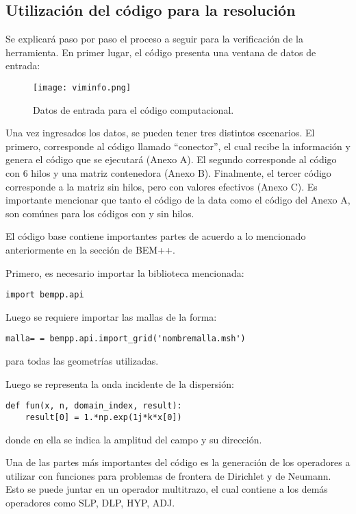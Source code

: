 \documentclass[12pt,letterpaper]{article}
\numberwithin{equation}{section}
\begin{document}
\subsection{Utilización del código para la resolución}

Se explicará paso por paso el proceso a seguir para la verificación de la herramienta. En primer lugar, el código presenta una ventana de datos de entrada:

\begin{figure}[H]
	\centering\texttt{[image: viminfo.png]}\\
	\caption{Datos de entrada para el código computacional.}
	\label{fig:viminfo}
\end{figure} 

Una vez ingresados los datos, se pueden tener tres distintos escenarios. El primero, corresponde al código llamado ``conector'', el cual recibe la información y genera el código que se ejecutará (Anexo A). El segundo corresponde al código con 6 hilos y una matriz contenedora (Anexo B). Finalmente, el tercer código corresponde a la matriz sin hilos, pero con valores efectivos (Anexo C). Es importante mencionar que tanto el código de la data como el código del Anexo A, son comúnes para los códigos con y sin hilos.

El código base contiene importantes partes de acuerdo a lo mencionado anteriormente en la sección de BEM++.

Primero, es necesario importar la biblioteca mencionada:

\begin{lstlisting}
import bempp.api
\end{lstlisting}
Luego se requiere importar las mallas de la forma:
\begin{lstlisting}
malla= = bempp.api.import_grid('nombremalla.msh')
\end{lstlisting}

\noindent para todas las geometrías utilizadas.

Luego se representa la onda incidente de la dispersión:

\begin{lstlisting}
def fun(x, n, domain_index, result):
	result[0] = 1.*np.exp(1j*k*x[0])
\end{lstlisting}

\noindent donde en ella se indica la amplitud del campo y su dirección.


Una de las partes más importantes del código es la generación de los operadores a utilizar con funciones para problemas de frontera de Dirichlet y de Neumann. Esto se puede juntar en un operador multitrazo, el cual contiene a los demás operadores como SLP, DLP, HYP, ADJ.
\end{document}
